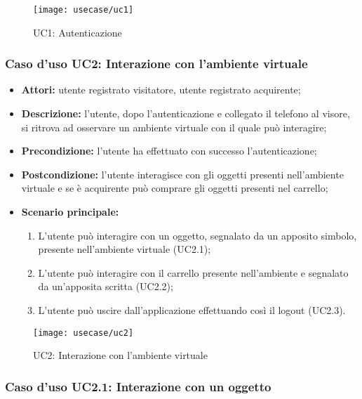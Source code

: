 \label{UC1}
\begin{figure}[ht]
	\begin{center}
		\texttt{[image: usecase/uc1]}
		\caption{UC1: Autenticazione}
	\end{center}
\end{figure}
\FloatBarrier

\subsubsection{Caso d'uso UC2: Interazione con l'ambiente virtuale}

\begin{itemize}
	\item \textbf{Attori:} utente registrato visitatore, utente registrato acquirente;
	\item \textbf{Descrizione:} l'utente, dopo l'autenticazione e collegato il telefono al visore, si ritrova ad osservare un ambiente virtuale con il quale può interagire;
	\item \textbf{Precondizione:} l'utente ha effettuato con successo l'autenticazione;
	\item \textbf{Postcondizione:} l'utente interagisce con gli oggetti presenti nell'ambiente virtuale e se è acquirente può comprare gli oggetti presenti nel carrello;
	\item \textbf{Scenario principale:}
	\begin{enumerate}
		\item L'utente può interagire con un oggetto, segnalato da un apposito simbolo, presente nell'ambiente virtuale (UC2.1);
		\item L'utente può interagire con il carrello presente nell'ambiente e segnalato da un'apposita scritta (UC2.2);
		\item L'utente può uscire dall'applicazione effettuando così il logout (UC2.3).
	\end{enumerate}
\end{itemize}

\label{UC2}
\begin{figure}[ht]
	\begin{center}
		\texttt{[image: usecase/uc2]}
		\caption{UC2: Interazione con l'ambiente virtuale}
	\end{center}
\end{figure}
\FloatBarrier

\subsubsection{Caso d'uso UC2.1: Interazione con un oggetto}

